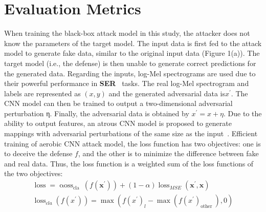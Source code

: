 \section{Evaluation Metrics}
When training the black-box attack model in this study, the attacker does not know the parameters of the target model. The input data is first fed to the attack model to generate fake data, similar to the original input data (Figure 1(a)). The target model (i.e., the defense) is then unable to generate correct predictions for the generated data.
Regarding the inputs, log-Mel spectrograms are used due to their powerful performance in \textbf{SER}~\cite{ren2020generating,zhang2017speech} tasks. The real log-Mel spectrogram and labels are represented as $(x, y)$ and the generated adversarial data is$x^{\prime}$. The CNN model can then be trained to output a two-dimensional adversarial perturbation η. Finally, the adversarial data is obtained by $x^{\prime}=x+\eta$. Due to the ability to output features, an atrous CNN model is proposed to generate mappings with adversarial perturbations of the same size as the input~\cite{ren2019attention}. Efficient training of aerobic
CNN attack model, the loss function has two objectives: one is to deceive the defense $f$, and the other is to minimize the difference between fake and real data. Thus, the loss function is a weighted sum of the loss functions of the two objectives:
$$
\begin{gathered}
	\operatorname{loss}=\operatorname{\alpha oss}_{\text {cla }}\left(f\left(\boldsymbol{x}^{\prime}\right)\right)+(1-\alpha) \operatorname{loss}_{M S E}\left(\boldsymbol{x}^{\prime}, \boldsymbol{x}\right) \\
	\operatorname{loss}_{c l a}\left(f\left(x^{\prime}\right)\right)=\max \left(f\left(x^{\prime}\right)_{l}-\max \left(f\left(x^{\prime}\right)_{\text {other }}\right), 0\right)
\end{gathered}
$$

